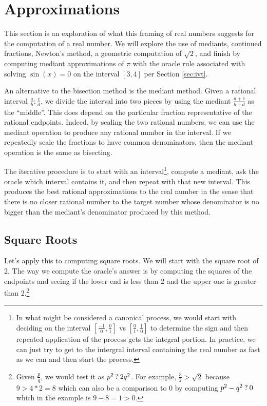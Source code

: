 \documentclass[12pt]{article}
\begin{document}
\section{Approximations}\label{sec:mediant}

This section is an exploration of what this framing of real numbers suggests for the computation of a real number. We will explore the use of mediants, continued fractions, Newton's method, a geometric computation of $\sqrt{2}$, and finish by computing mediant approximations of $\pi$ with the oracle  rule associated with solving $\sin(x)=0$ on the interval $[3,4]$ per Section \ref{sec:ivt}.

An alternative to the bisection method is the mediant method. Given a rational interval $\frac{a}{b} : \frac{c}{d}$, we divide the interval into two pieces by using the mediant $\frac{a+c}{b+d}$ as the ``middle''. This does depend on the particular fraction representative of the rational endpoints. Indeed, by scaling the two rational numbers, we can use the mediant operation to produce any rational number in the interval. If we repeatedly scale the fractions to have common denominators, then the mediant operation is the same as bisecting. 

The iterative procedure is to start with an interval\footnote{In what might be considered a canonical process, we would start with deciding on the interval $[\frac{-1}{0}, \frac{0}{1}]$ vs $[\frac{0}{1}, \frac{1}{0}]$ to determine the sign and then repeated application of the process gets the integral portion. In practice, we can just try to get to the intergral interval containing the real number as fast as we can and then start the process.}, compute a mediant, ask the oracle which interval contains it, and then repeat with that new interval. This produces the best rational approximations to the real number in the sense that there is no closer rational number to the target number whose denominator is no bigger than the mediant's denominator produced by this method. 


\subsection{Square Roots}

Let's apply this to computing square roots. We will start with the square root of 2. The way we compute the oracle's answer is by computing the squares of the endpoints and seeing if the lower end is less than 2 and the upper one is greater than 2.\footnote{Given $\frac{p}{q}$, we would test it as $p^2 \mathbin{?} 2q^2$. For example, $\frac{3}{2} > \sqrt{2}$ because $9 > 4*2 = 8$ which can also be a comparison to 0 by computing $p^2 - q^2 \mathbin{?} 0$ which in the example is $9-8=1 > 0$.}
\end{document}
